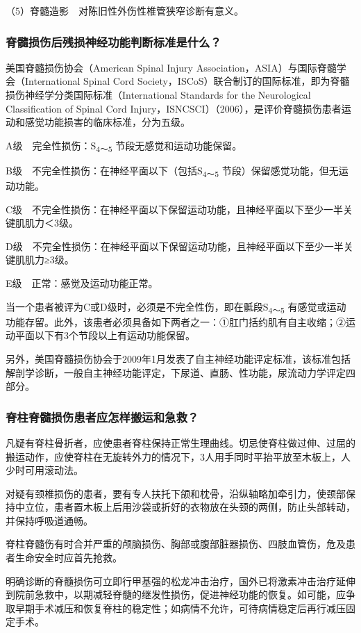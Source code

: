 （5）脊髓造影　对陈旧性外伤性椎管狭窄诊断有意义。

\subsubsection{脊髓损伤后残损神经功能判断标准是什么？}

美国脊髓损伤协会（American Spinal Injury
Association，ASIA）与国际脊髓学会（International Spinal Cord
Society，ISCoS）联合制订的国际标准，即为脊髓损伤神经学分类国际标准（International
Standards for the Neurological Classification of Spinal Cord
Injury，ISNCSCI）（2006），是评价脊髓损伤患者运动和感觉功能损害的临床标准，分为五级。

A级　完全性损伤：S\textsubscript{4～5} 节段无感觉和运动功能保留。

B级　不完全性损伤：在神经平面以下（包括S\textsubscript{4～5}
节段）保留感觉功能，但无运动功能。

C级　不完全性损伤：在神经平面以下保留运动功能，且神经平面以下至少一半关键肌肌力＜3级。

D级　不完全性损伤：在神经平面以下保留运动功能，且神经平面以下至少一半关键肌肌力≥3级。

E级　正常：感觉及运动功能正常。

当一个患者被评为C或D级时，必须是不完全性伤，即在骶段S\textsubscript{4～5}
有感觉或运动功能存留。此外，该患者必须具备如下两者之一：①肛门括约肌有自主收缩；②运动平面以下有3个节段以上有运动功能保留。

另外，美国脊髓损伤协会于2009年1月发表了自主神经功能评定标准，该标准包括解剖学诊断，一般自主神经功能评定，下尿道、直肠、性功能，尿流动力学评定四部分。

\subsubsection{脊柱脊髓损伤患者应怎样搬运和急救？}

凡疑有脊柱骨折者，应使患者脊柱保持正常生理曲线。切忌使脊柱做过伸、过屈的搬运动作，应使脊柱在无旋转外力的情况下，3人用手同时平抬平放至木板上，人少时可用滚动法。

对疑有颈椎损伤的患者，要有专人扶托下颌和枕骨，沿纵轴略加牵引力，使颈部保持中立位，患者置木板上后用沙袋或折好的衣物放在头颈的两侧，防止头部转动，并保持呼吸道通畅。

脊柱脊髓伤有时合并严重的颅脑损伤、胸部或腹部脏器损伤、四肢血管伤，危及患者生命安全时应首先抢救。

明确诊断的脊髓损伤可立即行甲基强的松龙冲击治疗，国外已将激素冲击治疗延伸到院前急救中，以期减轻脊髓的继发性损伤，促进神经功能的恢复。如可能，应争取早期手术减压和恢复脊柱的稳定性；如病情不允许，可待病情稳定后再行减压固定手术。

